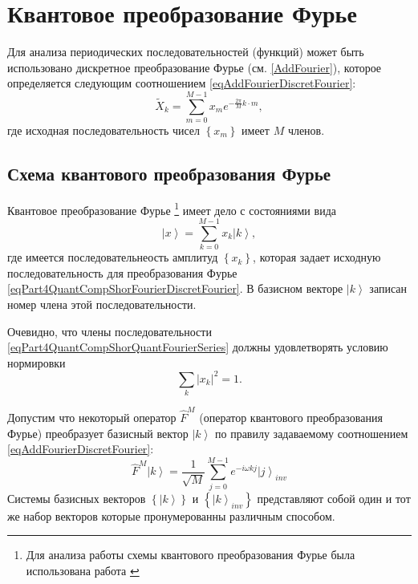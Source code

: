\section{Квантовое преобразование Фурье}
Для анализа периодических последовательностей (функций) может быть
использовано дискретное преобразование Фурье
(см. \autoref{AddFourier}), которое определяется следующим соотношением
\eqref{eqAddFourierDiscretFourier}:
\begin{equation}
\tilde{X}_k = \sum^{M - 1}_{m = 0} x_m e^{-\frac{2 \pi}{M} k\cdot m},
\label{eqPart4QuantCompShorFourierDiscretFourier}
\end{equation}
где исходная последовательность чисел $\left\{x_m\right\}$ имеет $M$
членов. 

\subsection{Схема квантового преобразования Фурье}
Квантовое преобразование Фурье
\footnote{Для анализа работы схемы квантового преобразования Фурье
  была использована работа \cite{DBLP:conf/new2an/2015}}
имеет дело с состояниями вида 
\begin{equation}
\left|x\right> = \sum_{k = 0}^{M - 1}x_k \left|k\right>,
\label{eqPart4QuantCompShorQuantFourierSeries}
\end{equation}
где имеется последовательнеость амплитуд $\left\{x_k\right\}$, которая
задает исходную последовательность для преобразования Фурье 
\eqref{eqPart4QuantCompShorFourierDiscretFourier}. В базисном векторе
$\left|k\right>$ записан номер члена этой последовательности.   

Очевидно, что члены последовательности
\eqref{eqPart4QuantCompShorQuantFourierSeries}  должны удовлетворять
условию нормировки 
\[
\sum_k\left|x_k\right|^2 = 1.
\]

Допустим что некоторый оператор $\hat{F}^{M}$ (оператор квантового
преобразования Фурье) преобразует базисный вектор $\left|k\right>$ по
правилу задаваемому соотношением \eqref{eqAddFourierDiscretFourier}:
\begin{equation}
\hat{F}^{M}\left|k\right> = \frac{1}{\sqrt{M}}\sum_{j = 0}^{M -1}
e^{-i \omega k j}\left|j\right>_{inv} 
\label{eqPart4QuantCompShorQuantFourierBasis}
\end{equation}
Системы базисных векторов $\left\{\left|k\right>\right\}$ и 
$\left\{\left|k\right>_{inv}\right\}$ представляют собой один и тот же
набор векторов которые пронумерованны различным способом.

